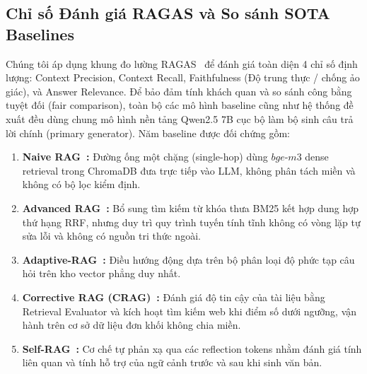 \documentclass[conference]{IEEEtran}
\begin{document}
\subsection{Chỉ số Đánh giá RAGAS và So sánh SOTA Baselines}
Chúng tôi áp dụng khung đo lường RAGAS~\cite{es2023ragas} để đánh giá toàn diện 4 chỉ số định lượng: Context Precision, Context Recall, Faithfulness (Độ trung thực / chống ảo giác), và Answer Relevance. Để bảo đảm tính khách quan và so sánh công bằng tuyệt đối (fair comparison), toàn bộ các mô hình baseline cũng như hệ thống đề xuất đều dùng chung mô hình nền tảng Qwen2.5 7B cục bộ làm bộ sinh câu trả lời chính (primary generator). Năm baseline được đối chứng gồm:
\begin{enumerate}
    \item \textbf{Naive RAG~\cite{lewis2020retrieval}:} Đường ống một chặng (single-hop) dùng $bge\text{-}m3$ dense retrieval trong ChromaDB đưa trực tiếp vào LLM, không phân tách miền và không có bộ lọc kiểm định.
    \item \textbf{Advanced RAG~\cite{gao2023modular}:} Bổ sung tìm kiếm từ khóa thưa BM25 kết hợp dung hợp thứ hạng RRF, nhưng duy trì quy trình tuyến tính tĩnh không có vòng lặp tự sửa lỗi và không có nguồn tri thức ngoài.
    \item \textbf{Adaptive-RAG~\cite{jeong2024adaptive}:} Điều hướng động dựa trên bộ phân loại độ phức tạp câu hỏi trên kho vector phẳng duy nhất.
    \item \textbf{Corrective RAG (CRAG)~\cite{yan2024corrective}:} Đánh giá độ tin cậy của tài liệu bằng Retrieval Evaluator và kích hoạt tìm kiếm web khi điểm số dưới ngưỡng, vận hành trên cơ sở dữ liệu đơn khối không chia miền.
    \item \textbf{Self-RAG~\cite{asai2023self}:} Cơ chế tự phản xạ qua các reflection tokens nhằm đánh giá tính liên quan và tính hỗ trợ của ngữ cảnh trước và sau khi sinh văn bản.
\end{enumerate}
\end{document}
